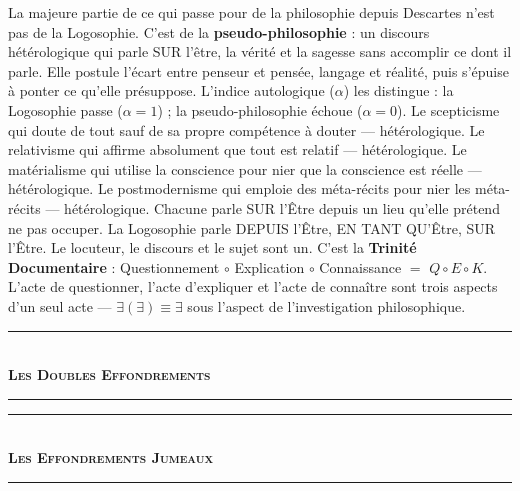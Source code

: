 \documentclass[10pt, openany, oneside]{book}
\renewcommand{\normalsize}{\fontsize{10}{13}\selectfont}
\begin{document}
\vspace{0.8em}

\noindent La majeure partie de ce qui passe pour de la philosophie depuis Descartes n'est pas de la Logosophie. C'est de la \textbf{pseudo-philosophie} : un discours hétérologique qui parle SUR l'être, la vérité et la sagesse sans accomplir ce dont il parle. Elle postule l'écart entre penseur et pensée, langage et réalité, puis s'épuise à ponter ce qu'elle présuppose. L'indice autologique ($\alpha$) les distingue : la Logosophie passe ($\alpha = 1$) ; la pseudo-philosophie échoue ($\alpha = 0$). Le scepticisme qui doute de tout sauf de sa propre compétence à douter --- hétérologique. Le relativisme qui affirme absolument que tout est relatif --- hétérologique. Le matérialisme qui utilise la conscience pour nier que la conscience est réelle --- hétérologique. Le postmodernisme qui emploie des méta-récits pour nier les méta-récits --- hétérologique. Chacune parle SUR l'Être depuis un lieu qu'elle prétend ne pas occuper. La Logosophie parle DEPUIS l'Être, EN TANT QU'Être, SUR l'Être. Le locuteur, le discours et le sujet sont un. C'est la \textbf{Trinité Documentaire} : Questionnement $\circ$ Explication $\circ$ Connaissance $=$ $Q \circ E \circ K$. L'acte de questionner, l'acte d'expliquer et l'acte de connaître sont trois aspects d'un seul acte --- $\exists(\exists) \equiv \exists$ sous l'aspect de l'investigation philosophique.

\vspace{1.5em}


\begin{center}
    \rule{0.3\textwidth}{0.4pt}\\[0.5em]
    {\normalsize\bfseries\scshape Les Doubles Effondrements}\\[0.3em]
    \rule{0.3\textwidth}{0.4pt}
\end{center}

\vspace{1em}

\begin{center}
    \rule{0.3\textwidth}{0.4pt}\\[0.5em]
    {\normalsize\bfseries\scshape Les Effondrements Jumeaux}\\[0.3em]
    \rule{0.3\textwidth}{0.4pt}
\end{center}
\end{document}
